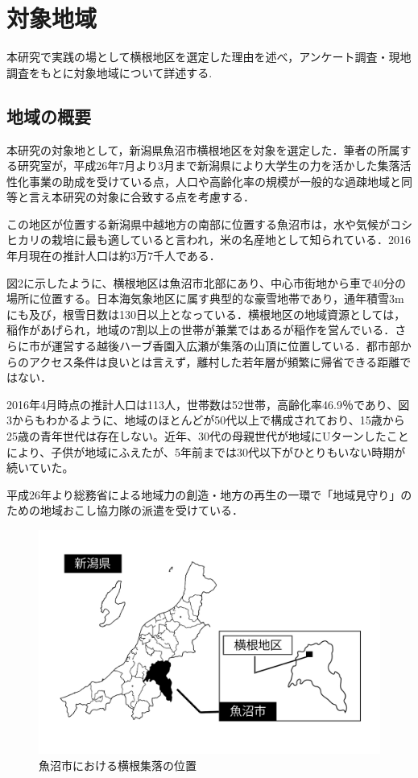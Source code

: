 \documentclass[a4paper]{jsarticle}
\begin{document}
\newpage
\section{対象地域}
本研究で実践の場として横根地区を選定した理由を述べ，アンケート調査・現地調査をもとに対象地域について詳述する.
\subsection{地域の概要}
本研究の対象地として，新潟県魚沼市横根地区を対象を選定した．筆者の所属する研究室が，平成26年7月より3月まで新潟県により大学生の力を活かした集落活性化事業の助成を受けている点，人口や高齢化率の規模が一般的な過疎地域と同等と言え本研究の対象に合致する点を考慮する．\par
この地区が位置する新潟県中越地方の南部に位置する魚沼市は，水や気候がコシヒカリの栽培に最も適していると言われ，米の名産地として知られている．2016年月現在の推計人口は約3万7千人である．\par
図2に示したように、横根地区は魚沼市北部にあり、中心市街地から車で40分の場所に位置する。日本海気象地区に属す典型的な豪雪地帯であり，通年積雪3mにも及び，根雪日数は130日以上となっている．横根地区の地域資源としては，稲作があげられ，地域の7割以上の世帯が兼業ではあるが稲作を営んでいる．さらに市が運営する越後ハーブ香園入広瀬が集落の山頂に位置している．都市部からのアクセス条件は良いとは言えず，離村した若年層が頻繁に帰省できる距離ではない．\par
2016年4月時点の推計人口は113人，世帯数は52世帯，高齢化率46.9％であり、図3からもわかるように、地域のほとんどが50代以上で構成されており、15歳から25歳の青年世代は存在しない。近年、30代の母親世代が地域にUターンしたことにより、子供が地域にふえたが、5年前までは30代以下がひとりもいない時期が続いていた。\par
平成26年より総務省による地域力の創造・地方の再生の一環で「地域見守り」のための地域おこし協力隊の派遣を受けている．
\begin{figure}[H]
  \begin{center}
    \includegraphics[width=1.0\hsize]{./images/yokone_place.pdf}
    \caption{魚沼市における横根集落の位置}
    \label{fig:tmu_hino}
  \end{center}
\end{figure}
\end{document}
